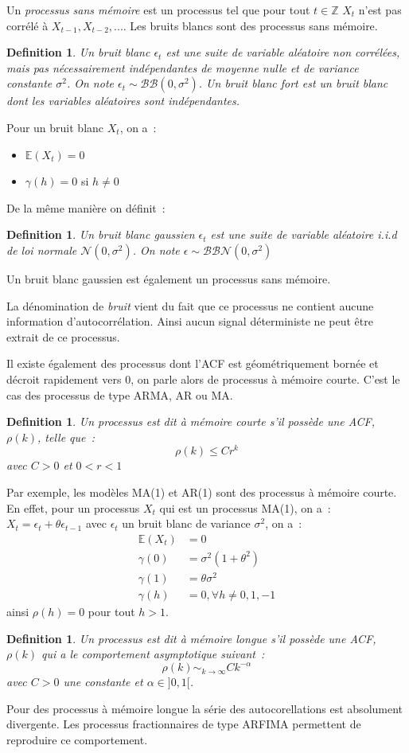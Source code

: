\documentclass[11pt]{scrartcl} %
\newtheorem{Def}[theorem]{Definition}
\newcommand{\Z}{\mathbb{Z}}
\newcommand{\E}[1]{\mathbb{E}\left(#1\right)}
\newcommand{\bb}[1]{\mathcal{BB}\left(0,#1\right)}
\newcommand{\bbn}[1]{\mathcal{BBN}\left(0,#1\right)}
\begin{document}
Un \textit{processus sans mémoire} est un processus tel que pour tout $t\in\Z$ $X_t$ n'est pas corrélé à $X_{t-1}, X_{t-2},...$. Les bruits blancs sont des processus sans mémoire.


\begin{Def}\label{BB}
Un bruit blanc $\epsilon_t$ est une suite de variable aléatoire non corrélées, mais pas nécessairement indépendantes de moyenne nulle et de variance constante $\sigma^2$. On note $\epsilon_t\sim \bb{\sigma^2}$.
\newline 
Un \textit{bruit blanc fort} est un bruit blanc dont les variables aléatoires sont indépendantes.
\end{Def}
Pour un bruit blanc $X_t$, on a~:
\begin{itemize}
\item $\E{X_t}=0$
\item $\gamma(h)=0$ si $h\not =0$
\end{itemize}
De la même manière on définit~:
\begin{Def}\label{BBG}
Un bruit blanc gaussien $\epsilon_t$ est une suite de variable aléatoire i.i.d de loi normale $\mathcal{N}\left(0,\sigma^2\right)$. On note $\epsilon\sim \bbn{\sigma^2}$
\end{Def}
Un bruit blanc gaussien est également un processus sans mémoire.


La dénomination de \textit{bruit} vient du fait que ce processus ne contient aucune information d'autocorrélation. Ainsi aucun signal déterministe ne peut être extrait de ce processus. 


Il existe également des processus dont l'ACF est géométriquement bornée et décroit rapidement vers 0, on parle alors de processus à mémoire courte. C'est le cas des processus de type ARMA, AR ou MA.
\begin{Def}\label{defCourte}
Un processus est dit à mémoire courte s'il possède une ACF, $\rho(k)$, telle que~:
$$
\rho(k)\leq Cr^{k}
$$
avec $C>0$ et $0<r<1$
\end{Def}
Par exemple, les modèles MA(1) et AR(1) sont des processus à mémoire courte. En effet, pour un processus $X_t$ qui est un processus MA(1), on a~:~$X_t=\epsilon_t+\theta\epsilon_{t-1}$ avec $\epsilon_t$ un bruit blanc de variance $\sigma^2$, on a~:
\begin{align*}
\E{X_t}&=0\\
\gamma(0)&=\sigma^2(1+\theta^2)\\
\gamma(1) &= \theta\sigma^2\\
\gamma(h)&= 0, \forall h\not=0,1,-1
\end{align*}
ainsi $\rho(h)=0$ pour tout $h>1$.
\begin{Def}
Un processus est dit à mémoire longue s'il possède une ACF, $\rho(k)$ qui a le comportement asymptotique suivant~:
$$
\rho(k)\sim_{k\rightarrow \infty} Ck^{-\alpha}
$$
avec $C>0$ une constante et $\alpha\in ]0,1[$.
\end{Def}
Pour des processus à mémoire longue la série des autocorellations est absolument divergente. Les processus fractionnaires de type ARFIMA permettent de reproduire ce comportement.
\end{document}
